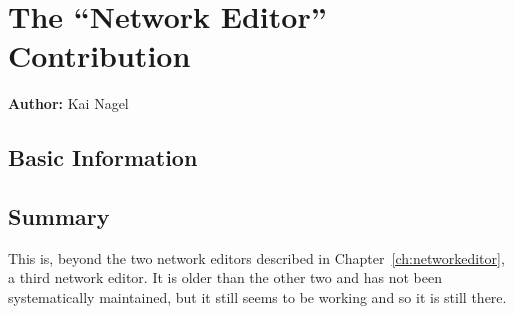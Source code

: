 \chapter{The ``Network Editor'' Contribution}
\label{sec:contrib-networkEditor}

\hfill \textbf{Author:} Kai Nagel


\section{Basic Information}

\section{Summary}
This is, beyond the two network editors described in Chapter~\ref{ch:networkeditor}, a third network editor. 
It is older than the other two and has not been systematically maintained, but it still seems to be working and so it is still there.

